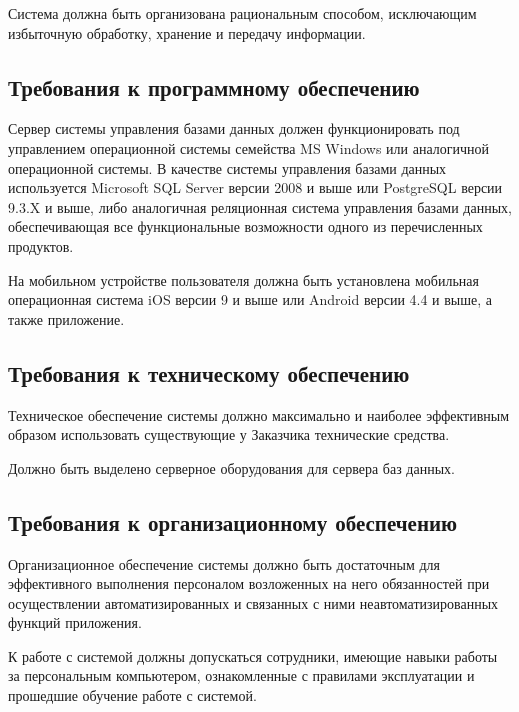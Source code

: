 \documentclass[14pt]{extreport}
\begin{document}
Система должна быть организована рациональным способом, исключающим избыточную обработку, хранение и передачу информации.

\subsection{Требования к программному обеспечению}
Сервер системы управления базами данных должен функционировать под управлением операционной системы семейства MS Windows или аналогичной операционной системы. В качестве системы управления базами данных  используется Microsoft SQL Server версии 2008 и выше или PostgreSQL версии 9.3.X и выше, либо аналогичная реляционная система управления базами данных, обеспечивающая все функциональные возможности одного из перечисленных продуктов.

На мобильном устройстве пользователя должна быть установлена мобильная операционная система iOS версии 9 и выше или Android версии 4.4 и выше, а также приложение. 

\subsection{Требования к техническому обеспечению}
Техническое обеспечение системы должно максимально и наиболее эффективным образом использовать существующие у Заказчика технические средства.

Должно быть выделено серверное оборудования для сервера баз данных.

\subsection{Требования к организационному обеспечению}
Организационное обеспечение системы должно быть достаточным для эффективного выполнения персоналом возложенных на него обязанностей при осуществлении автоматизированных и связанных с ними неавтоматизированных функций приложения.

К работе с системой должны допускаться сотрудники, имеющие навыки работы за персональным компьютером, ознакомленные с правилами эксплуатации и прошедшие обучение работе с системой.
\end{document}

